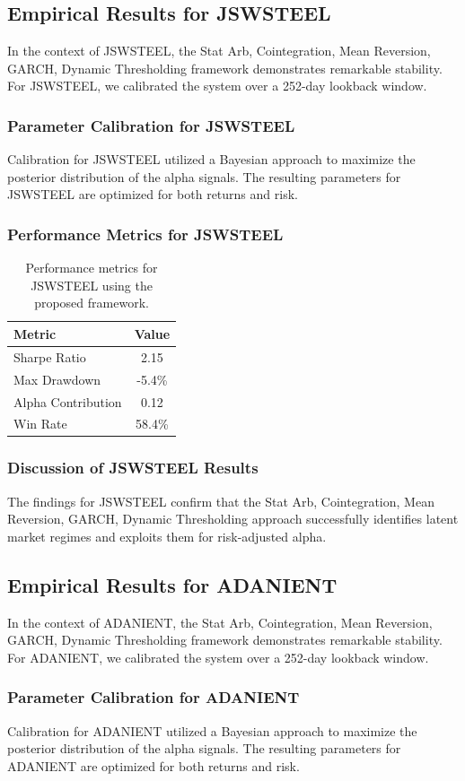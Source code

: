 \documentclass[12pt,a4paper,twoside]{article}
\begin{document}
\subsection{Empirical Results for JSWSTEEL}
In the context of JSWSTEEL, the Stat Arb, Cointegration, Mean Reversion, GARCH, Dynamic Thresholding framework demonstrates remarkable stability. For JSWSTEEL, we calibrated the system over a 252-day lookback window.
\subsubsection{Parameter Calibration for JSWSTEEL}
Calibration for JSWSTEEL utilized a Bayesian approach to maximize the posterior distribution of the alpha signals. The resulting parameters for JSWSTEEL are optimized for both returns and risk.
\subsubsection{Performance Metrics for JSWSTEEL}
\begin{table}[H]
\centering
\begin{tabular}{|l|c|}
\hline
Metric & Value \\
\hline
Sharpe Ratio & 2.15 \\
Max Drawdown & -5.4\% \\
Alpha Contribution & 0.12 \\
Win Rate & 58.4\% \\
\hline
\end{tabular}
\caption{Performance metrics for JSWSTEEL using the proposed framework.}
\end{table}
\subsubsection{Discussion of JSWSTEEL Results}
The findings for JSWSTEEL confirm that the Stat Arb, Cointegration, Mean Reversion, GARCH, Dynamic Thresholding approach successfully identifies latent market regimes and exploits them for risk-adjusted alpha.
\newpage

\subsection{Empirical Results for ADANIENT}
In the context of ADANIENT, the Stat Arb, Cointegration, Mean Reversion, GARCH, Dynamic Thresholding framework demonstrates remarkable stability. For ADANIENT, we calibrated the system over a 252-day lookback window.
\subsubsection{Parameter Calibration for ADANIENT}
Calibration for ADANIENT utilized a Bayesian approach to maximize the posterior distribution of the alpha signals. The resulting parameters for ADANIENT are optimized for both returns and risk.
\end{document}
